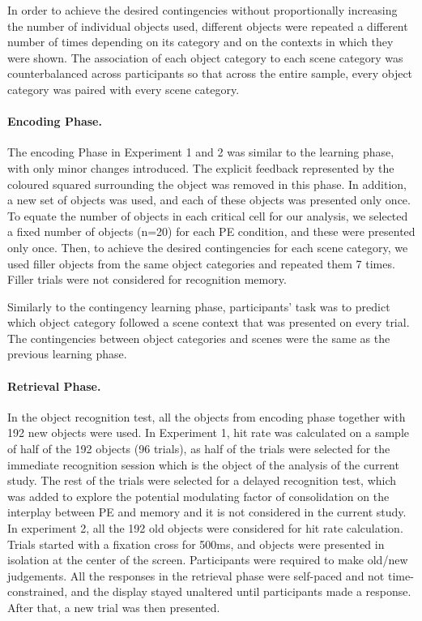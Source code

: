 \documentclass[a4paper,12pt]{article}
\begin{document}
In order to achieve the desired contingencies without proportionally increasing the number of individual objects used, different objects were repeated a different number of times depending on its category and on the contexts in which they were shown. The association of each object category to each scene category was counterbalanced across participants so that across the entire sample, every object category was paired with every scene category.
\paragraph{Encoding Phase.}
The encoding Phase in Experiment 1 and 2 was similar to the learning phase, with only minor changes introduced. The explicit feedback represented by the coloured squared surrounding the object was removed in this phase. In addition, a new set of objects was used, and each of these objects was presented only once. To equate the number of objects in each critical cell for our analysis, we selected a fixed number of objects (n=20) for each PE condition, and these were presented only once. Then, to achieve the desired contingencies for each scene category, we used filler objects from the same object categories and repeated them 7 times. Filler trials were not considered for recognition memory. \par
Similarly to the contingency learning phase, participants' task was to predict which object category followed a scene context that was presented on every trial. The contingencies between object categories and scenes were the same as the previous learning phase. 
\paragraph{Retrieval Phase.}
In the object recognition test, all the objects from encoding phase together with 192 new objects were used. 
In Experiment 1, hit rate was calculated on a sample of half of the 192 objects (96 trials), as half of the trials were selected for the immediate recognition session which is the object of the analysis of the current study. The rest of the trials were selected for a delayed recognition test, which was added to explore the potential modulating factor of consolidation on the interplay between PE and memory and it is not considered in the current study. In experiment 2, all the 192 old objects were considered for hit rate calculation. Trials started with a fixation cross for 500ms, and objects were presented in isolation at the center of the screen. Participants were required to make old/new judgements. All the responses in the retrieval phase were self-paced and not time-constrained, and the display stayed unaltered until participants made a response. After that, a new trial was then presented.
\end{document}
